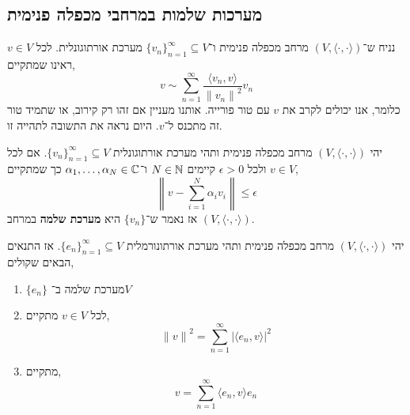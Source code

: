 \subsection{מערכות שלמות במרחבי מכפלה פנימית}
נניח ש־$(V, \langle \cdot, \cdot \rangle)$ מרחב מכפלה פנימית ו־${\{ v_n \}}_{n = 1}^{\infty} \subseteq V$ מערכת אורתוגונלית.
לכל $v \in V$ ראינו שמתקיים,
\[
	v
	\sim \sum_{n = 1}^\infty \frac{\langle v_n, v \rangle}{{\lVert v_n \rVert}^2} v_n
\]
כלומר, אנו יכולים לקרב את $v$ עם טור פורייה.
אותנו מעניין אם זהו רק קירוב, או שתמיד טור זה מתכנס ל־$v$.
היום נראה את התשובה לתהייה זו.
\begin{definition}
	יהי $(V, \langle \cdot, \cdot \rangle)$ מרחב מכפלה פנימית ותהי מערכת אורתוגונלית ${\{ v_n \}}_{n = 1}^\infty \subseteq V$.
	אם לכל $v \in V$ ולכל $\epsilon > 0$ קיימים $N \in \mathbb{N}$ ו־$\alpha_1, \ldots, \alpha_N \in \mathbb{C}$ כך שמתקיים,
	\[
		\left\lVert v - \sum_{i = 1}^N \alpha_i v_i \right\rVert \le \epsilon
	\]
	אז נאמר ש־$\{ v_n \}$ היא \textbf{מערכת שלמה} במרחב $(V, \langle \cdot, \cdot \rangle)$.
\end{definition}
\begin{theorem}
	יהי $(V, \langle \cdot, \cdot \rangle)$ מרחב מכפלה פנימית ותהי מערכת אורתונורמלית ${\{ e_n \}}_{n = 1}^\infty \subseteq V$.
	אז התנאים הבאים שקולים,
	\begin{enumerate}
		\item $\{ e_n \}$ מערכת שלמה ב־$V$
		\item לכל $v \in V$ מתקיים,
			\[
				{\lVert v \rVert}^2
				= \sum_{n = 1}^\infty {|\langle e_n, v \rangle|}^2
			\]
		\item מתקיים,
			\[
				v
				= \sum_{n = 1}^\infty \langle e_n, v \rangle e_n
			\]
	\end{enumerate}
\end{theorem}
